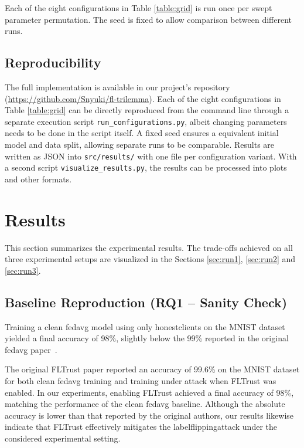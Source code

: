 \documentclass[11pt,twocolumn,a4paper,DIV=calc,parskip=half]{scrartcl}
\begin{document}
	Each of the eight configurations in Table \ref{table:grid} is run once per swept parameter permutation. The seed is fixed to allow comparison between different runs.

	
	\subsection{Reproducibility}
	\label{ssec:reproducibility}
	The full implementation is available in our project's repository (\url{https://github.com/Snyuki/fl-trilemma}). Each of the eight configurations in Table \ref{table:grid} can be directly reproduced from the command line through a separate execution script \texttt{run\_configurations.py}, albeit changing parameters needs to be done in the script itself. A fixed seed ensures a equivalent initial model and data split, allowing separate runs to be comparable. Results are written as JSON into \texttt{src/results/} with one file per configuration variant. With a second script \texttt{visualize\_results.py}, the results can be processed into plots and other formats.

	\section{Results}
	\label{sec:results}
	This section summarizes the experimental results. The trade-offs achieved on all three experimental setups are visualized in the Sections \ref{sec:run1}, \ref{sec:run2} and \ref{sec:run3}.
	\subsection{Baseline Reproduction (RQ1 -- Sanity Check)}
	
	Training a clean \gls{fedavg} model using only \glspl{honestclient} on the MNIST dataset yielded a final accuracy of 98\%, slightly below the 99\% reported in the original \gls{fedavg} paper~\cite{mcmahan2017fedavg}.
	
	The original FLTrust paper reported an accuracy of 99.6\% on the MNIST dataset for both clean \gls{fedavg} training and training under attack when FLTrust was enabled. In our experiments, enabling FLTrust achieved a final accuracy of 98\%, matching the performance of the clean \gls{fedavg} baseline. Although the absolute accuracy is lower than that reported by the original authors, our results likewise indicate that FLTrust effectively mitigates the \gls{labelflippingattack} under the considered experimental setting.
\end{document}
